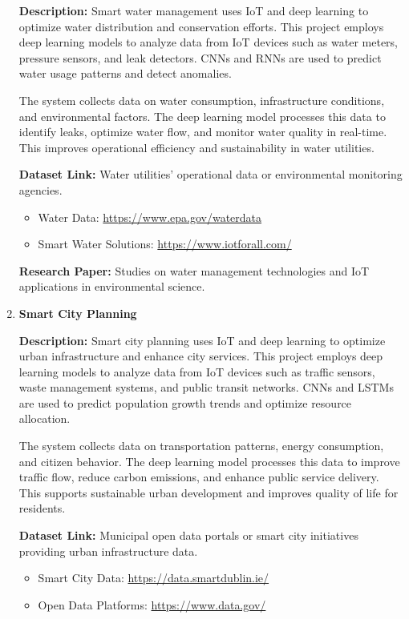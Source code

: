 \documentclass{article}
\begin{document}
\begin{enumerate}[label=\textbf{\arabic*.}, leftmargin=*]
\textbf{Description:}
Smart water management uses IoT and deep learning to optimize water distribution and conservation efforts. This project employs deep learning models to analyze data from IoT devices such as water meters, pressure sensors, and leak detectors. CNNs and RNNs are used to predict water usage patterns and detect anomalies.

The system collects data on water consumption, infrastructure conditions, and environmental factors. The deep learning model processes this data to identify leaks, optimize water flow, and monitor water quality in real-time. This improves operational efficiency and sustainability in water utilities.

\textbf{Dataset Link:} Water utilities' operational data or environmental monitoring agencies.
\begin{itemize}
    \item Water Data: \url{https://www.epa.gov/waterdata}
    \item Smart Water Solutions: \url{https://www.iotforall.com/}
\end{itemize}

\textbf{Research Paper:} Studies on water management technologies and IoT applications in environmental science.

\item \textbf{Smart City Planning}

\textbf{Description:}
Smart city planning uses IoT and deep learning to optimize urban infrastructure and enhance city services. This project employs deep learning models to analyze data from IoT devices such as traffic sensors, waste management systems, and public transit networks. CNNs and LSTMs are used to predict population growth trends and optimize resource allocation.

The system collects data on transportation patterns, energy consumption, and citizen behavior. The deep learning model processes this data to improve traffic flow, reduce carbon emissions, and enhance public service delivery. This supports sustainable urban development and improves quality of life for residents.

\textbf{Dataset Link:} Municipal open data portals or smart city initiatives providing urban infrastructure data.
\begin{itemize}
    \item Smart City Data: \url{https://data.smartdublin.ie/}
    \item Open Data Platforms: \url{https://www.data.gov/}
\end{itemize}


\end{enumerate}
\end{document}

